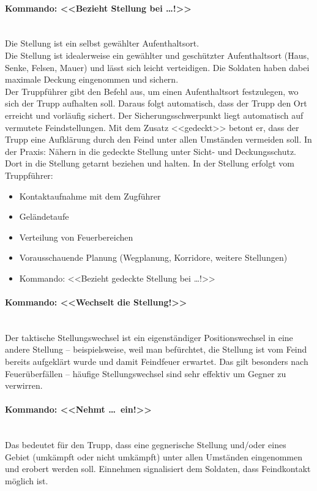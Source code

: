 \paragraph*{Kommando: <<Bezieht Stellung bei \dots!>>}\ \\
	Die Stellung ist ein selbst gewählter Aufenthaltsort. \\
	Die Stellung ist idealerweise ein gewählter und geschützter Aufenthaltsort (Haus, Senke, Felsen, Mauer) und lässt sich leicht verteidigen. Die Soldaten haben dabei maximale Deckung eingenommen und sichern. \\
	Der Truppführer gibt den Befehl aus, um einen Aufenthaltsort festzulegen, wo sich der Trupp aufhalten soll. Daraus folgt automatisch, dass der Trupp den Ort erreicht und vorläufig sichert. Der Sicherungsschwerpunkt liegt automatisch auf vermutete Feindstellungen. Mit dem Zusatz <<gedeckt>> betont er, dass der Trupp eine Aufklärung durch den Feind unter allen Umständen vermeiden soll. In der Praxis: Nähern in die gedeckte Stellung unter Sicht- und Deckungsschutz. Dort in die Stellung getarnt beziehen und halten. In der Stellung erfolgt vom Truppführer:
		\begin{itemize}
			\item Kontaktaufnahme mit dem Zugführer 
			\item Geländetaufe 
			\item Verteilung von Feuerbereichen 
			\item Vorausschauende Planung (Wegplanung, Korridore, weitere Stellungen) 
			\item Kommando: <<Bezieht gedeckte Stellung bei \dots!>> 
		\end{itemize}

\paragraph*{Kommando: <<Wechselt die Stellung!>>}\ \\
	Der taktische Stellungswechsel ist ein eigenständiger Positionswechsel in eine andere Stellung – beispielsweise, weil man befürchtet, die Stellung ist vom Feind bereits aufgeklärt wurde und damit Feindfeuer erwartet. Das gilt besonders nach Feuerüberfällen – häufige Stellungswechsel sind sehr effektiv um Gegner zu verwirren.

\paragraph*{Kommando: <<Nehmt \dots\ ein!>>}\ \\
	Das bedeutet für den Trupp, dass eine gegnerische Stellung und/oder eines Gebiet (umkämpft oder nicht umkämpft) unter allen Umständen eingenommen und erobert werden soll. Einnehmen signalisiert dem Soldaten, dass Feindkontakt möglich ist.

